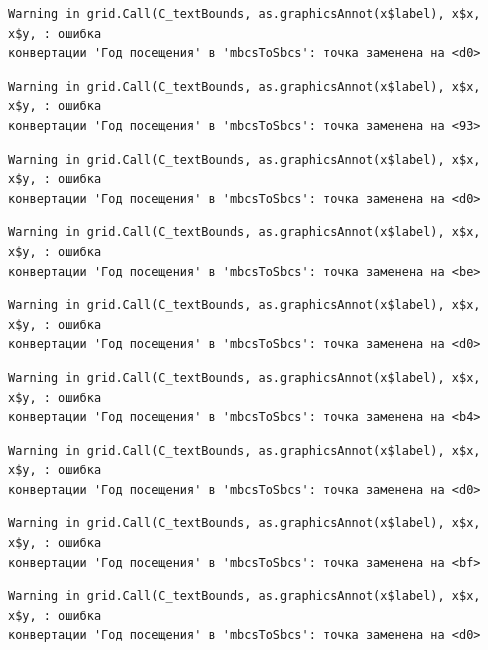 \documentclass[
  letterpaper,
  DIV=11,
  numbers=noendperiod]{scrreprt}
\begin{document}
\begin{verbatim}
Warning in grid.Call(C_textBounds, as.graphicsAnnot(x$label), x$x, x$y, : ошибка
конвертации 'Год посещения' в 'mbcsToSbcs': точка заменена на <d0>
\end{verbatim}

\begin{verbatim}
Warning in grid.Call(C_textBounds, as.graphicsAnnot(x$label), x$x, x$y, : ошибка
конвертации 'Год посещения' в 'mbcsToSbcs': точка заменена на <93>
\end{verbatim}

\begin{verbatim}
Warning in grid.Call(C_textBounds, as.graphicsAnnot(x$label), x$x, x$y, : ошибка
конвертации 'Год посещения' в 'mbcsToSbcs': точка заменена на <d0>
\end{verbatim}

\begin{verbatim}
Warning in grid.Call(C_textBounds, as.graphicsAnnot(x$label), x$x, x$y, : ошибка
конвертации 'Год посещения' в 'mbcsToSbcs': точка заменена на <be>
\end{verbatim}

\begin{verbatim}
Warning in grid.Call(C_textBounds, as.graphicsAnnot(x$label), x$x, x$y, : ошибка
конвертации 'Год посещения' в 'mbcsToSbcs': точка заменена на <d0>
\end{verbatim}

\begin{verbatim}
Warning in grid.Call(C_textBounds, as.graphicsAnnot(x$label), x$x, x$y, : ошибка
конвертации 'Год посещения' в 'mbcsToSbcs': точка заменена на <b4>
\end{verbatim}

\begin{verbatim}
Warning in grid.Call(C_textBounds, as.graphicsAnnot(x$label), x$x, x$y, : ошибка
конвертации 'Год посещения' в 'mbcsToSbcs': точка заменена на <d0>
\end{verbatim}

\begin{verbatim}
Warning in grid.Call(C_textBounds, as.graphicsAnnot(x$label), x$x, x$y, : ошибка
конвертации 'Год посещения' в 'mbcsToSbcs': точка заменена на <bf>
\end{verbatim}

\begin{verbatim}
Warning in grid.Call(C_textBounds, as.graphicsAnnot(x$label), x$x, x$y, : ошибка
конвертации 'Год посещения' в 'mbcsToSbcs': точка заменена на <d0>
\end{verbatim}
\end{document}
